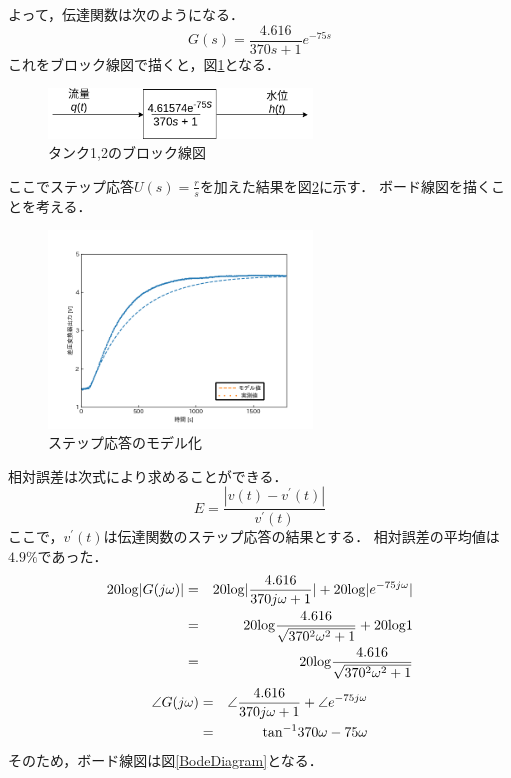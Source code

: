 \documentclass[12pt]{jsarticle}
\begin{document}
よって，伝達関数は次のようになる．
\begin{equation}
  \label{}
  G(s) = \frac{4.616}{370s+1}e^{-75s}
\end{equation}
これをブロック線図で描くと，図\ref{Tank_BlockDiag}となる．
\begin{figure}[tb]
  \begin{center}
    \includegraphics[clip,width=7.0cm]{../img/Tank_BlockDiag.png}
    \caption{タンク1,2のブロック線図}
    \label{Tank_BlockDiag}
  \end{center}
\end{figure}
ここでステップ応答$U(s)=\frac{r}{s}$を加えた結果を図\ref{StepResponseModeling}に示す．
ボード線図を描くことを考える．
\begin{figure}[tb]
  \begin{center}
    \includegraphics[clip,width=7.0cm]{../graph/stepResponse_approximity.png}
    \caption{ステップ応答のモデル化}
    \label{StepResponseModeling}
  \end{center}
\end{figure}
相対誤差は次式により求めることができる．
\begin{equation}
  E = \frac{|v(t) - v^{\prime}(t)|}{v^{\prime}(t)}
\end{equation}
ここで，$v^{\prime}(t)$は伝達関数のステップ応答の結果とする．
相対誤差の平均値は$4.9\%$であった．
\begin{eqnarray}
  20{\rm log}|G(j\omega)| &=& 20{\rm log}|\frac{4.616}{370j\omega+1}| + 20{\rm log}|e^{-75j\omega}| \\
  &=& 20{\rm log}\frac{4.616}{\sqrt{370^2\omega^2+1}} + 20{\rm log}1 \\
  &=& 20{\rm log}\frac{4.616}{\sqrt{370^2\omega^2+1}}
\end{eqnarray}
\begin{eqnarray}
  \angle G(j\omega) &=& \angle \frac{4.616}{370j\omega+1} + \angle e^{-75j\omega} \\
  &=& {\rm tan}^{-1}370\omega - 75\omega
\end{eqnarray}
そのため，ボード線図は図\ref{BodeDiagram}となる．
\end{document}
